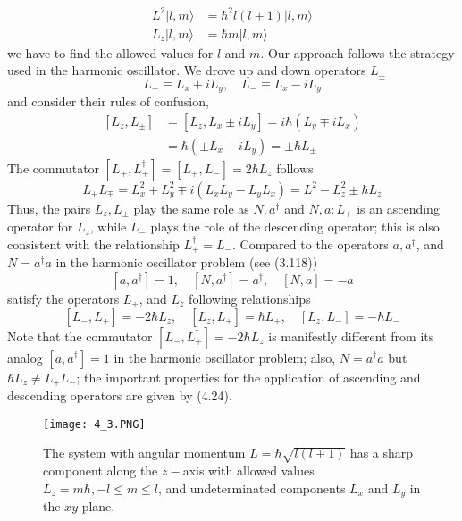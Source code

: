 \begin{equation}
\begin{aligned} L^{2}|l, m\rangle &=\hbar^{2} l(l+1)|l, m\rangle \\ L_{z}|l, m\rangle &=\hbar m|l, m\rangle \end{aligned}
\end{equation}
we have to find the allowed values ​​for $l$ and $m$. Our approach follows the strategy used in the harmonic oscillator. We drove up and down operators $L_{\pm}$
\begin{equation}
    L_{+}\equiv L_x+iL_y,\quad L_{-}\equiv L_x-iL_y
\end{equation}
and consider their rules of confusion,
\begin{equation}
\begin{aligned}\left[L_{z}, L_{\pm}\right] &=\left[L_{z}, L_{x} \pm i L_{y}\right]=i \hbar\left(L_{y} \mp i L_{x}\right) \\ &=\hbar\left(\pm L_{x}+i L_{y}\right)=\pm \hbar L_{\pm} \end{aligned}
\end{equation}
The commutator $[L_+, L^{\dagger}_+] = [L_+, L_-] = 2 \hbar L_z$ follows
\begin{equation}
    L_{\pm} L_{\mp}=L_{x}^{2}+L_{y}^{2} \mp i\left(L_{x} L_{y}-L_{y} L_{x}\right)=L^{2}-L_{z}^{2} \pm \hbar L_{z}
    \end{equation}
Thus, the pairs $L_z, L_{\pm}$ play the same role as $N, a^{\dagger}$ and $N, a: L_+$ is an ascending operator for $L_z$, while $L_-$ plays the role of the descending operator; this is also consistent with the relationship $L^{\dagger}_+ = L_-$. Compared to the operators $a, a^{\dagger}$, and $N = a^{\dagger} a$ in the harmonic oscillator problem (see (3.118))
$$[a,a^{\dagger}]=1, \quad [N,a^{\dagger}]=a^{\dagger}, \quad [N,a]=-a$$
satisfy the operators $L_{\pm}$, and $L_z$ following relationships
\begin{equation}
    \left[L_{-}, L_{+}\right]=-2 \hbar L_{z}, \quad\left[L_{z}, L_{+}\right]=\hbar L_{+}, \quad\left[L_{z}, L_{-}\right]=-\hbar L_{-}
    \end{equation}
Note that the commutator $[L_-, L^{\dagger}_+] = -2\hbar L_z$ is manifestly different from its analog $[a, a^{\dagger}] = 1$ in the harmonic oscillator problem; also, $N = a^{\dagger} a$ but $\hbar L_z  \neq L_+ L_-$; the important properties for the application of ascending and descending operators are given by (4.24).
\begin{figure}[ht]
    \begin{minipage}{0.5\textwidth}
        \centering
        \texttt{[image: 4\_3.PNG]}
    \end{minipage}
    \begin{minipage}{0.5\textwidth}
        \caption{The system with angular momentum $L = \hbar\sqrt{l (l + 1)}$ has a sharp component along the $z-$axis with allowed values $L_z = m\hbar, -l\leq m\leq l$, and undeterminated components $L_x$ and $L_y$ in the $xy$ plane.}
    \end{minipage}
\end{figure}
